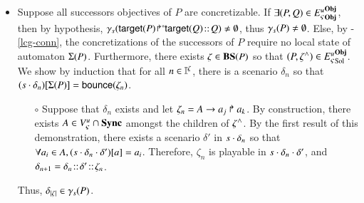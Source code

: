 \begin{proofapproxinf}
\begin{itemize}
  \item Suppose all successors objectives of $P$ are concretizable.
    If $\exists (P, Q) \in {E_\varsigma^u}^{\mathbf{Obj}}_{\mathbf{Obj}}$, then by hypothesis,
      $\gamma_{s}({\mathsf{target}(P)\!\Rsh^*\!\!\mathsf{target}(Q)} \!::\! Q) \neq \emptyset$, thus
      $\gamma_{s}(P) \neq \emptyset$.
    Else, by -\ref{lcg-conn}, the concretizations of the successors of $P$ require no local state of automaton $\Sigma(P)$.
      Furthermore, there exists $\zeta \in \mathbf{BS}(P)$ so that $(P, \zeta^\wedge) \in {E_\varsigma^u}^{\mathbf{Obj}}_{\mathrm{Sol}}$.
      We show by induction that for all $n \in \mathbb{I}^{\zeta}$, there is a scenario $\delta_n$ so that ${(s \cdot \delta_n)[\Sigma(P)]} = \mathsf{bounce}(\zeta_n)$.
      \begin{itemize}
        \item[$\circ$] Suppose that $\delta_n$ exists and let $\zeta_n = A\rightarrow a_j\Rsh a_k$.
        By construction, there exists $A \in {V_\varsigma^u} \cap \mathbf{Sync}$
        amongst the children of $\zeta^\wedge$.
        By the first result of this demonstration,
        there exists a scenario $\delta'$ in $s \cdot \delta_n$ so that
        $\forall a_i \in A, {(s \cdot \delta_n \cdot \delta')[a]} = a_i$.
        Therefore, $\zeta_n$ is playable in $s \cdot \delta_n \cdot \delta'$,
        and $\delta_{n+1} = \delta_n \!::\! \delta' \!::\! \zeta_n$.
      \end{itemize}
      Thus, $\delta_{|\zeta|} \in \gamma_s(P)$. %
\end{itemize}
\end{proofapproxinf}
